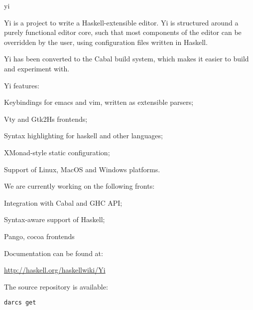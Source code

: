 \begin{hcarentry}[section]{yi}
\label{yi}
\makeheader

Yi is a project to write a Haskell-extensible editor. Yi is structured
around a purely functional editor core, such that most components of
the editor can be overridden by the user, using configuration files
written in Haskell.

Yi has been converted to the Cabal build system, which makes it easier to
build and experiment with.

Yi features:
\begin{compactitem}
\item Keybindings for emacs and vim, written as extensible parsers;
\item Vty and Gtk2Hs frontends;
\item Syntax highlighting for haskell and other languages;
\item XMonad-style static configuration;
\item Support of Linux, MacOS and Windows platforms.
\end{compactitem}

We are currently working on the following fronts:
\begin{compactitem}
\item Integration with Cabal and GHC API;
\item Syntax-aware support of Haskell;
\item Pango, cocoa frontends
\end{compactitem}

\FurtherReading
\begin{compactitem}
\item Documentation can be found at:

 \url{http://haskell.org/haskellwiki/Yi}

\item The source repository is available:

 \texttt{darcs get}

\end{compactitem}
\end{hcarentry}
